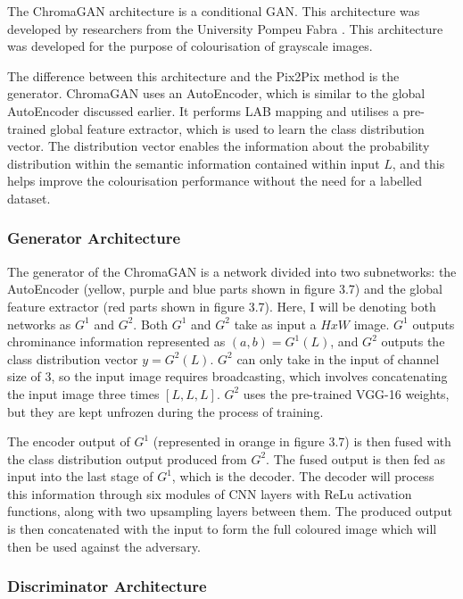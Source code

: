 The ChromaGAN architecture is a conditional GAN. This architecture was developed by researchers from the University Pompeu Fabra \cite{DBLP:journals/corr/abs-1907-09837}. This architecture was developed for the purpose of colourisation of grayscale images. 

The difference between this architecture and the Pix2Pix method is the generator. ChromaGAN uses an AutoEncoder, which is similar to the global AutoEncoder discussed earlier. It performs LAB mapping and utilises a pre-trained global feature extractor, which is used to learn the class distribution vector. The distribution vector enables the information about the probability distribution within the semantic information contained within input \(L\), and this helps improve the colourisation performance without the need for a labelled dataset.




\subsubsection*{Generator Architecture}

The generator of the ChromaGAN is a network divided into two subnetworks: the AutoEncoder (yellow, purple and blue parts shown in figure 3.7) and the global feature extractor (red parts shown in figure 3.7). Here, I will be denoting both networks as \(G^1\) and  \(G^2\). Both \(G^1\) and \(G^2\) take as input a \(H x W\) image. \(G^1\) outputs chrominance information represented as \((a,b) = G^1(L)\), and \(G^2\) outputs the class distribution vector \(y = G^2(L)\). \(G^2\) can only take in the input of channel size of 3, so the input image requires broadcasting, which involves concatenating the input image three times \([L,L,L]\). \(G^2\) uses the pre-trained VGG-16 weights, but they are kept unfrozen during the process of training.

The encoder output of \(G^1\) (represented in orange in figure 3.7) is then fused with the class distribution output produced from \(G^2\). The fused output is then fed as input into the last stage of \(G^1\), which is the decoder. The decoder will process this information through six modules of CNN layers with ReLu activation functions, along with two upsampling layers between them. The produced output is then concatenated with the input to form the full coloured image which will then be used against the adversary.

\subsubsection*{Discriminator Architecture}

